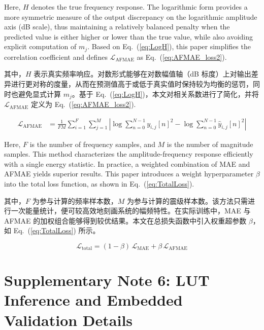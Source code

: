 \documentclass[sn-nature]{sn-jnl}
\newif\ifCNENEnglish
\newif\ifCNENBilingual
\newcommand{\CNEN}[2]{%
    \ifCNENBilingual
        #1%
        \if\relax\detokenize{#2}\relax\else\par #2\fi%
    \else
        \ifCNENEnglish
            #2%
        \else
            #1%
        \fi
    \fi
}
\newcommand{\magn}{m} %
\newcommand{\fidx}{i} %
\newcommand{\fmax}{F} %
\newcommand{\midx}{j} %
\newcommand{\mmax}{M} %
\newcommand{\pidx}{n} %
\newcommand{\pmax}{N} %
\newcommand{\wMAE}{\beta} %
\begin{document}
\CNEN{其中，$H$ 表示真实频率响应。对数形式能够在对数幅值轴（dB 标度）上对输出差异进行更对称的度量，从而在预测值高于或低于真实值时保持较为均衡的惩罚，同时也避免显式计算 $\magn_\midx$。基于 Eq.~(\ref{eq:LogH})，本文对相关系数进行了简化，并将 $\mathcal{L}_{\text{AFMAE}}$ 定义为 Eq.~(\ref{eq:AFMAE_loss2}).}{Here, $H$ denotes the true frequency response. The logarithmic form provides a more symmetric measure of the output discrepancy on the logarithmic amplitude axis (dB scale), thus maintaining a relatively balanced penalty when the predicted value is either higher or lower than the true value, while also avoiding explicit computation of $\magn_\midx$. Based on Eq.~(\ref{eq:LogH}), this paper simplifies the correlation coefficient and defines $\mathcal{L}_{\text{AFMAE}}$ as Eq.~(\ref{eq:AFMAE_loss2}).%
}
\begin{equation}
    \begin{aligned}
        \mathcal{L}_{\text{AFMAE}} & =  \frac{1}{\fmax\mmax} \sum_{\fidx=1}^{\fmax} \sum_{\midx=1}^{\mmax}        \left|
        \log \sum_{\pidx=0}^{\pmax-1}y_{\fidx,\midx}[n]^2
        - \log \sum_{\pidx=0}^{\pmax-1}\hat{y}_{\fidx,\midx}[n]^2
        \right|
    \end{aligned}
    \label{eq:AFMAE_loss2}
\end{equation}

\CNEN{其中，$\fmax$ 为参与计算的频率样本数，$\mmax$ 为参与计算的震级样本数。该方法只需进行一次能量统计，便可较高效地刻画系统的幅频特性。在实际训练中，MAE 与 AFMAE 的加权组合能够得到较优结果。本文在总损失函数中引入权重超参数 $\wMAE$，如 Eq.~(\ref{eq:TotalLoss}) 所示。}{Here, $\fmax$ is the number of frequency samples, and $\mmax$ is the number of magnitude samples. This method characterizes the amplitude-frequency response efficiently with a single energy statistic. In practice, a weighted combination of MAE and AFMAE yields superior results. This paper introduces a weight hyperparameter $\wMAE$ into the total loss function, as shown in Eq.~(\ref{eq:TotalLoss}).%
}
\begin{equation}
    \mathcal{L}_{\text{total}}
    = (1-\wMAE)\,\mathcal{L}_{\text{MAE}}
    + \wMAE\,\mathcal{L}_{\text{AFMAE}}
    \label{eq:TotalLoss}
\end{equation}


\section{Supplementary Note 6: LUT Inference and Embedded Validation Details}
\end{document}
